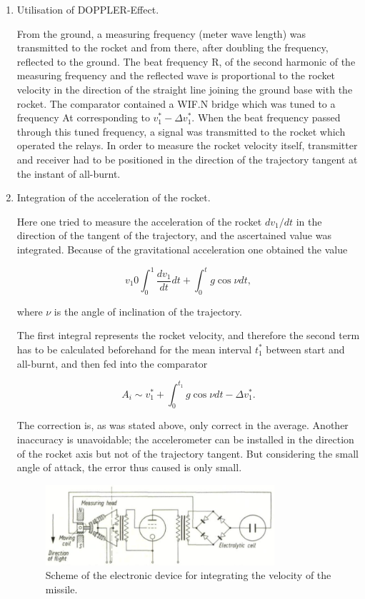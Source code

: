 \documentclass[12pt, a4paper]{article}
\begin{document}
\begin{enumerate}
  \item Utilisation of DOPPLER-Effect.

  From the ground, a measuring frequency (meter wave length) was transmitted to the rocket and from there, after doubling the frequency, reflected to the ground. The beat frequency R, of the second harmonic of the measuring frequency and the reflected wave is proportional to the rocket velocity in the direction of the straight line joining the ground base with the rocket. The comparator contained a WIF.N bridge which was tuned to a frequency At corresponding to $v_{1}^{*}-\Delta v_{1}^{*}$. When the beat frequency passed through this tuned frequency, a signal was transmitted to the rocket which operated the relays. In order to measure the rocket velocity itself, transmitter and receiver had to be positioned in the direction of the trajectory tangent at the instant of all-burnt.

  \item Integration of the acceleration of the rocket.

Here one tried to measure the acceleration of the rocket $dv_{1}/ dt$ in the direction of the tangent of the trajectory, and the ascertained value was integrated. Because of the gravitational acceleration one obtained the value

\begin{equation}
  v_{1}0\int_{0}^{1}\frac{dv_{1}}{dt}dt+\int_{0}^{t}g\cos{\nu dt},
\end{equation}

where $\nu$ is the angle of inclination of the trajectory.

The first integral represents the rocket velocity, and therefore the second term has to be calculated beforehand for the mean interval $t_{1}^{*}$ between start and all-burnt, and then fed into the comparator

\begin{equation}
  A_{i}\sim v_{1}^{*}+\int_{0}^{t_{1}}g\cos{\nu dt}-\Delta v_{1}^{*}.
\end{equation}

The correction is, as was stated above, only correct in the average. Another inaccuracy is unavoidable; the accelerometer can be installed in the direction of the rocket axis but not of the trajectory tangent. But considering the small angle of attack, the error thus caused is only small.

\begin{figure}[ht]
  \centering
  \includegraphics[width=0.8\textwidth]{figs/ctrl-08.png}
  \caption{Scheme of the electronic device for integrating the velocity of the missile.}
  \label{fig:08}
\end{figure}


\end{enumerate}
\end{document}
